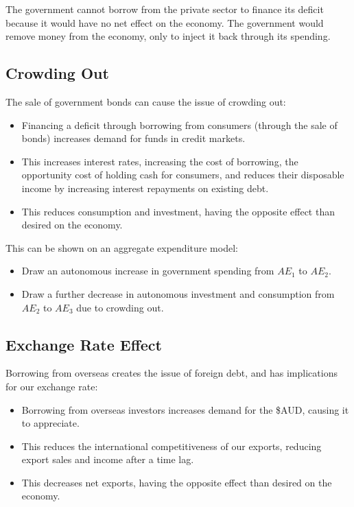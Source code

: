 \documentclass[a4paper,11pt]{report}
\begin{document}
The government cannot borrow from the private sector to finance its deficit
because it would have no net effect on the economy. The government would remove
money from the economy, only to inject it back through its spending.

\subsection{Crowding Out}

The sale of government bonds can cause the issue of crowding out:

\begin{itemize}
\item Financing a deficit through borrowing from consumers (through the sale of
	bonds) increases demand for funds in credit markets.
\item This increases interest rates, increasing the cost of borrowing, the
	opportunity cost of holding cash for consumers, and reduces their disposable
	income by increasing interest repayments on existing debt.
\item This reduces consumption and investment, having the opposite effect than
	desired on the economy.
\end{itemize}

This can be shown on an aggregate expenditure model:

\begin{itemize}
\item Draw an autonomous increase in government spending from $AE_1$ to $AE_2$.
\item Draw a further decrease in autonomous investment and consumption from
	$AE_2$ to $AE_3$ due to crowding out.
\end{itemize}

\subsection{Exchange Rate Effect}

Borrowing from overseas creates the issue of foreign debt, and has implications
for our exchange rate:

\begin{itemize}
\item Borrowing from overseas investors increases demand for the \$AUD, causing
	it to appreciate.
\item This reduces the international competitiveness of our exports, reducing
	export sales and income after a time lag.
\item This decreases net exports, having the opposite effect than desired on
	the economy.
\end{itemize}
\end{document}

